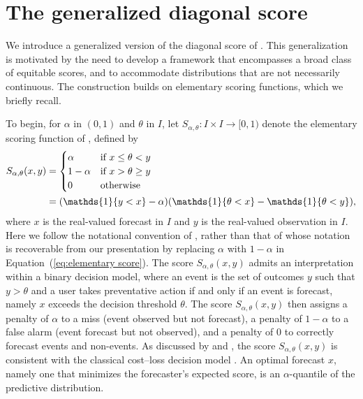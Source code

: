 \documentclass[10pt]{article} %
\theoremstyle{theorem}
\theoremstyle{definition}
\newcommand{\one}{\mathds{1}}
\begin{document}
\section{The generalized diagonal score}\label{s:GDS}
We introduce a generalized version of the diagonal score of \citet{ben2018diagonal}. This generalization is motivated by the need to develop a framework that encompasses a broad class of equitable scores, and to accommodate distributions that are not necessarily continuous. The construction builds on elementary scoring functions, which we briefly recall.

To begin, for $\alpha$ in $(0,1)$ and $\theta$ in $I$, let $S_{\alpha,\theta}:I\times I\to[0,1)$ denote the elementary scoring function of \citet{ehm2016quantiles}, defined by
\begin{align}
S_{\alpha,\theta}(x,y)
&=
\begin{cases}
\alpha & \text{if } x \leq\theta<y \\
1-\alpha & \text{if } x >\theta\geq y \\
0 & \text{otherwise}
\end{cases} \notag \\ 
&= (\one\{y<x\} - \alpha)(\one\{\theta < x\} - \one\{\theta < y\}),  \label{eq:elementary score}
\end{align}
where $x$ is the real-valued forecast in $I$ and $y$ is the real-valued observation in $I$. Here we follow the notational convention of \citet{ehm2016quantiles}, rather than that of \citet{ben2018diagonal} whose notation is recoverable from our presentation by replacing $\alpha$ with $1-\alpha$ in Equation~(\ref{eq:elementary score}). The score $S_{\alpha,\theta}(x,y)$ admits an interpretation within a binary decision model, where an event is the set of outcomes $y$ such that $y>\theta$ and a user takes preventative action if and only if an event is forecast, namely $x$ exceeds the decision threshold $\theta$. The score $S_{\alpha,\theta}(x,y)$ then assigns a penalty of $\alpha$ to a miss (event observed but not forecast), a penalty of $1-\alpha$ to a false alarm (event forecast but not observed), and a penalty of $0$ to correctly forecast events and non-events. As discussed by \citet{ehm2016quantiles} and \citet{ben2018diagonal}, the score $S_{\alpha,\theta}(x,y)$ is consistent with the classical cost–loss decision model \citep{murphy1977value, richardson2000skill}. An optimal forecast $x$, namely one that minimizes the forecaster's expected score, is an $\alpha$-quantile of the predictive distribution.
\end{document}
